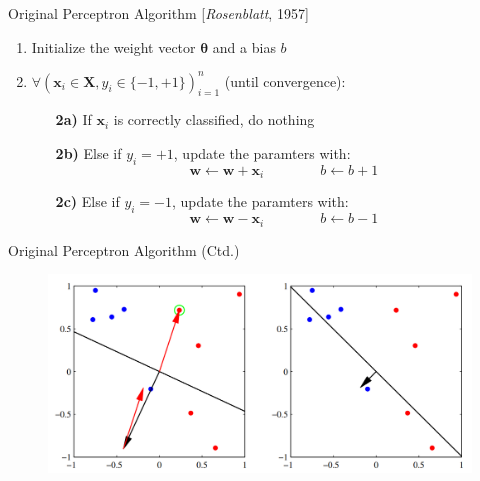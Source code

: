 \begin{frame}{Original Perceptron Algorithm [\textit{Rosenblatt}, 1957]}{}
	\begin{enumerate}
		\item Initialize the weight vector $\bm{\theta}$ and a bias $b$
		\item $\forall (\bm{x}_i \in \bm{X}, y_i \in \{ -1, +1 \})_{i=1}^n$ (until convergence):
		\begin{itemize}
			\item[\textbf{2a)}] If $\bm{x}_i$ is correctly classified, do nothing
			\item[\textbf{2b)}] Else if $y_i = +1$, update the paramters with:
			\begin{equation*}
				\bm{w} \longleftarrow \bm{w} + \bm{x}_i \qquad\qquad b \longleftarrow b + 1
			\end{equation*}
			\item[\textbf{2c)}] Else if $y_i = -1$, update the paramters with:
			\begin{equation*}
				\bm{w} \longleftarrow \bm{w} - \bm{x}_i \qquad\qquad b \longleftarrow b - 1
			\end{equation*}
		\end{itemize}
	\end{enumerate}
\end{frame}


\begin{frame}{Original Perceptron Algorithm (Ctd.)}{}
	\begin{figure}
		\centering
		\includegraphics[scale=0.35]{10_deep_learning/02_img/perceptron_1}
	\end{figure}
\end{frame}


